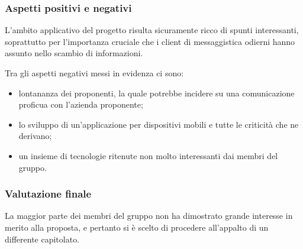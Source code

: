 		\subsubsection{Aspetti positivi e negativi}
		L'ambito applicativo del progetto risulta sicuramente ricco di spunti interessanti, soprattutto per l'importanza cruciale che i client di messaggistica odierni hanno assunto nello scambio di informazioni.

		Tra gli aspetti negativi messi in evidenza ci sono:
		\begin{itemize}
			\item lontananza dei proponenti, la quale potrebbe incidere su una comunicazione proficua con l'azienda proponente;
			\item lo sviluppo di un'applicazione per dispositivi mobili e tutte le criticità che ne derivano;
			\item un insieme di tecnologie ritenute non molto interessanti dai membri del gruppo.
		\end{itemize}
		\subsubsection{Valutazione finale}
		La maggior parte dei membri del gruppo non ha dimostrato grande interesse in merito alla proposta, e pertanto si è scelto di procedere all'appalto di un differente capitolato.


